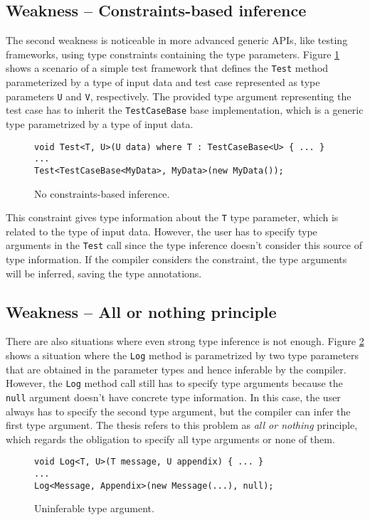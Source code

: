 \subsection{Weakness -- Constraints-based inference}

The second weakness is noticeable in more advanced generic APIs, like testing frameworks, using type constraints containing the type parameters. 
Figure \ref{img28:usecase2} shows a scenario of a simple test framework that defines the \texttt{Test} method parameterized by a type of input data and test case represented as type parameters \texttt{U} and \texttt{V}, respectively. 
The provided type argument representing the test case has to inherit the \texttt{TestCaseBase} base implementation, which is a generic type parametrized by a type of input data. 
\begin{figure}[h]
\begin{lstlisting}[style=csharp]
void Test<T, U>(U data) where T : TestCaseBase<U> { ... }
...
Test<TestCaseBase<MyData>, MyData>(new MyData());
\end{lstlisting}
\caption{No constraints-based inference.}
\label{img28:usecase2}
\end{figure}
This constraint gives type information about the \texttt{T} type parameter, which is related to the type of input data.
However, the user has to specify type arguments in the \texttt{Test} call since the type inference doesn’t consider this source of type information. 
If the compiler considers the constraint, the type arguments will be inferred, saving the type annotations.

\subsection{Weakness -- All or nothing principle}

There are also situations where even strong type inference is not enough.
Figure \ref{img29:usecase3} shows a situation where the \texttt{Log} method is parametrized by two type parameters that are obtained in the parameter types and hence inferable by the compiler. 
However, the \texttt{Log} method call still has to specify type arguments because the \texttt{null} argument doesn’t have concrete type information. 
In this case, the user always has to specify the second type argument, but the compiler can infer the first type argument. 
The thesis refers to this problem as \textit{all or nothing} principle, which regards the obligation to specify all type arguments or none of them.
\begin{figure}[h]
\begin{lstlisting}[style=csharp]
void Log<T, U>(T message, U appendix) { ... }
...
Log<Message, Appendix>(new Message(...), null);
\end{lstlisting}
\caption{Uninferable type argument.}
\label{img29:usecase3}
\end{figure}

